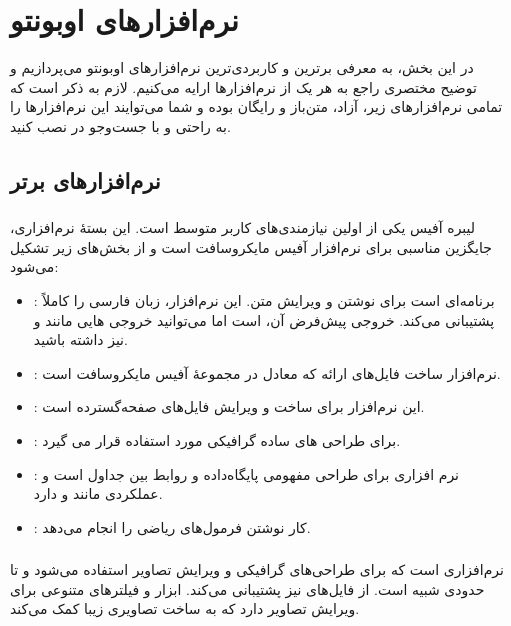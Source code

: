 \chapter{نرم‌افزارهای اوبونتو}
در این بخش، به معرفی برترین و کاربردی‌ترین نرم‌افزارهای اوبونتو می‌پردازیم و توضیح مختصری راجع به هر یک از نرم‌افزارها ارایه می‌کنیم. لازم به ذکر است که تمامی نرم‌افزارهای زیر، آزاد، متن‌باز و رایگان بوده و شما می‌توایند این نرم‌افزارها را به راحتی و با جست‌و‌جو در  نصب کنید.


\section{نرم‌افزارهای برتر}
\subsection[LibreOffice]{}
لیبره آفیس یکی از اولین نیازمندی‌های کاربر متوسط است. این بستهٔ نرم‌افزاری، جایگزین مناسبی برای نرم‌افزار آفیس مایکروسافت است و از بخش‌های زیر تشکیل می‌شود:
\begin{itemize}
\item {}: برنامه‌ای است برای نوشتن و ویرایش متن. این نرم‌افزار، زبان فارسی را کاملاً پشتیبانی می‌کند. خروجی پیش‌فرض آن،  است اما می‌توانید خروجی هایی مانند  و  نیز داشته باشید.
\item {}: نرم‌افزار ساخت فایل‌های ارائه که معادل  در مجموعهٔ آفیس مایکروسافت است.
\item {}: این نرم‌افزار برای ساخت و ویرایش فایل‌های صفحه‌گسترده است.
\item {}: برای طراحی های ساده گرافیکی مورد استفاده قرار می گیرد.
\item {}: نرم افزاری برای طراحی مفهومی پایگاه‌داده و روابط بین جداول است و عملکردی مانند  و  دارد.
\item {}: کار نوشتن فرمول‌های ریاضی را انجام می‌دهد.
\end{itemize}

\subsection[Gimp]{}
نرم‌افزاری است که برای طراحی‌های گرافیکی و ویرایش تصاویر استفاده می‌شود و تا حدودی شبیه  است. از فایل‌های  نیز پشتیبانی می‌کند. ابزار و فیلترهای متنوعی برای ویرایش تصاویر دارد که به ساخت تصاویری زیبا کمک می‌کند.

